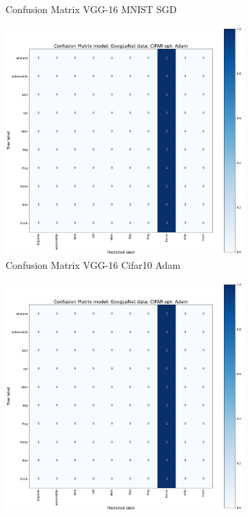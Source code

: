 \documentclass[conference]{IEEEtran}
\begin{document}
\begin{figure}[!htbp]
\begin{subfigure}[b]{0.22\textwidth}
        \caption{Confusion Matrix VGG-16 MNIST SGD}
        \label{fig:x matrix_VGG_MNIST_SGD}
    \end{subfigure}
    \begin{subfigure}[b]{0.22\textwidth}
        \centering
        \includegraphics[width=\textwidth]{img/matrix_sample.png}
        \caption{Confusion Matrix VGG-16 Cifar10 Adam}
        \label{fig:x matrix_VGG_CIFAR_Adam}
    \end{subfigure}
    \hfill
    \begin{subfigure}[b]{0.22\textwidth}
        \centering
        \includegraphics[width=\textwidth]{img/matrix_sample.png}

\end{subfigure}
\end{figure}
\end{document}
